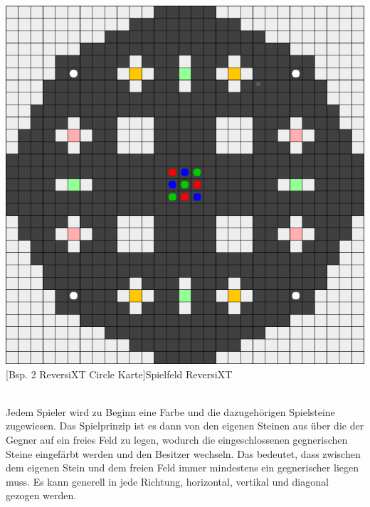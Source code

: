 \documentclass[12pt,a4paper,bibliography=totocnumbered,listof=totocnumbered]{article}
\begin{document}
\vspace{1em}
\begin{minipage}{\linewidth}
	\centering
	\includegraphics[width=0.7\linewidth]{pics/reversixt_circle_map.png}
	[Bsp. 2 ReversiXT Circle Karte]{Spielfeld ReversiXT}
	\label{fig:reversixt_circle_map}
\end{minipage}
\\

Jedem Spieler wird zu Beginn eine Farbe und die dazugehörigen Spielsteine zugewiesen. Das Spielprinzip ist es dann von den eigenen Steinen aus über die der Gegner auf ein freies Feld zu legen, wodurch die eingeschlossenen gegnerischen Steine eingefärbt werden und den Besitzer wechseln. Das bedeutet, dass zwischen dem eigenen Stein und dem freien Feld immer mindestens ein gegnerischer liegen muss. Es kann generell in jede Richtung, horizontal, vertikal und diagonal gezogen werden.
\end{document}
